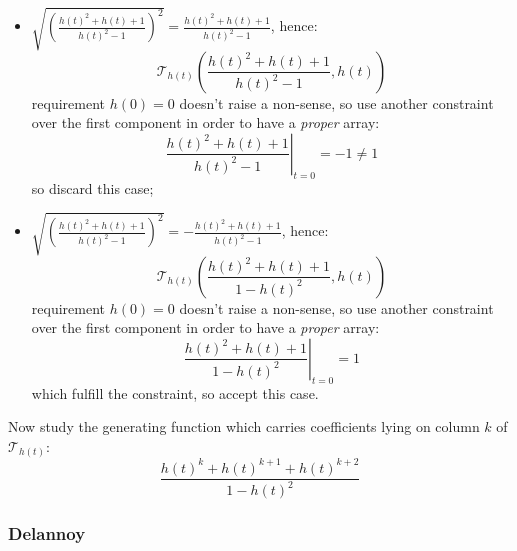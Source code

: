 \documentclass[11pt,a4paper]{article} %
\begin{document}
    \begin{itemize}
        \item $\sqrt{\left(\frac{h(t)^2+h(t)+1}{h(t)^2-1}\right)^{2}}=\frac{h(t)^2+h(t)+1}{h(t)^2-1}$, hence:
            \begin{displaymath} 
                \mathcal{T}_{h(t)}\left(\frac{h(t)^2+h(t)+1}{h(t)^2-1}, h(t) \right)
            \end{displaymath} 
            requirement $h(0)=0$ doesn't raise a non-sense, so use another 
            constraint over the first component in order to have a 
            \emph{proper} array:
            \begin{displaymath}
                \left. \frac{h(t)^2+h(t)+1}{h(t)^2-1} \right|_{t=0} = -1 \not= 1 
            \end{displaymath} 
            so discard this case;
        \item $\sqrt{\left(\frac{h(t)^2+h(t)+1}{h(t)^2-1}\right)^{2}}=-\frac{h(t)^2+h(t)+1}{h(t)^2-1}$, hence:
            \begin{displaymath}
                \mathcal{T}_{h(t)}\left(\frac{h(t)^2+h(t)+1}{1-h(t)^2}, h(t) \right)
            \end{displaymath} 
            requirement $h(0)=0$ doesn't raise a non-sense, so use another 
            constraint over the first component in order to have a 
            \emph{proper} array:
            \begin{displaymath}
                \left. \frac{h(t)^2+h(t)+1}{1-h(t)^2} \right|_{t=0} = 1 
            \end{displaymath} 
            which fulfill the constraint, so accept this case.
    \end{itemize}
    Now study the generating function which carries coefficients lying on column $k$
    of $\mathcal{T}_{h(t)}$:
    \begin{displaymath} 
        \frac{h(t)^{k}+h(t)^{k+1}+h(t)^{k+2}}{1-h(t)^2 }
    \end{displaymath} 


    \subsubsection{Delannoy}
\end{document}
